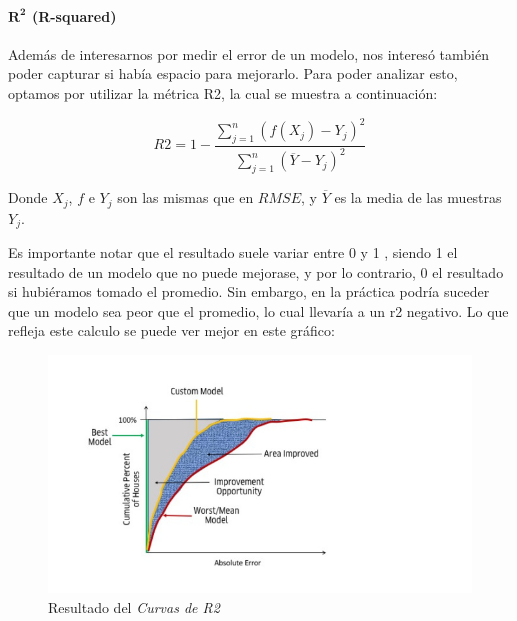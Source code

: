        
        \paragraph{$\mathbf{R^2}$ (R-squared)}\mbox{}\vspace{1em}
        
        Además de interesarnos por medir el error de un modelo, nos interesó también poder capturar si había espacio para mejorarlo. Para poder analizar esto, optamos por utilizar la métrica R2, la cual se muestra a continuación:
        
        \[ R2= 1 - \frac{\sum_{j=1}^{n} (f(X_j) - Y_j)^2}
                    {\sum_{j=1}^{n} (\overline{Y} - Y_j)^2}\]
        
        Donde $X_j$, $f$ e $Y_j$ son las mismas que en $RMSE$, y $\overline{Y}$ es la media de las muestras $Y_j$.
        
        Es importante notar que el resultado suele variar entre 0 y 1 , siendo 1 el resultado de un modelo que no puede mejorase, y por lo contrario, 0 el resultado si hubiéramos tomado el promedio. Sin embargo, en la práctica podría suceder que un modelo sea peor que el promedio, lo cual llevaría a un r2 negativo. Lo que refleja este calculo se puede ver mejor en este gráfico:
        
        \begin{figure}[H]
            \centering
            \includegraphics[scale=0.5]{img/explicaciones/R2-Curves.jpg}
            \caption{Resultado del \textit{Curvas de R2}}
            \label{fig:R2-Curves}
        \end{figure}
        
